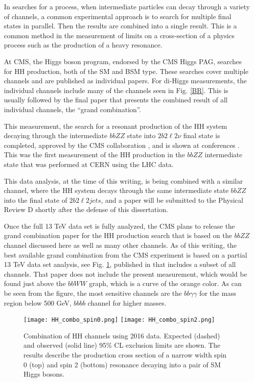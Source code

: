 \begin{small}
In searches for a process, when intermediate particles can decay through a variety of channels, a common experimental approach is to search for multiple final states in parallel. Then the results are combined into a single result. This is a common method in the measurement of limits on a cross-section of a physics process such as the production of a heavy resonance.

At CMS, the Higgs boson program, endorsed by the CMS Higgs PAG, searches for HH production, both of the SM and BSM type. These searches cover multiple channels and are published as individual papers. For di-Higgs measurements, the individual channels include many of the channels seen in Fig. \ref{BR}. This is usually followed by the final paper that presents the combined result of all individual channels, the ``grand combination''.

This measurement, the search for a resonant production of the HH system decaying through the intermediate $bbZZ$ state into $2 b 2 \ell 2 \nu$ final state is completed, approved by the CMS collaboration \cite{CMS-PAS-HIG-17-032}, and is shown at conferences \cite{HiggsCouplings2018}. This was the first measurement of the HH production in the $bbZZ$ intermediate state that was performed at CERN using the LHC data. 

This data analysis, at the time of this writing, is being combined with a similar channel, where the HH system decays through the same intermediate state $bbZZ$ into the final state of $2 b 2 \ell 2 jets$, and a paper will be submitted to the Physical Review D shortly after the defense of this dissertation.

Once the full 13 TeV data set is fully analyzed, the CMS plans to release the grand combination paper for the HH production search that is based on the $bbZZ$ channel discussed here as well as many other channels. As of this writing, the best available grand combination from the CMS experiment is based on a partial 13 TeV data set analysis, see Fig. \ref{HH_combo}, published in \cite{HH_combo} that includes a subset of all channels. That paper does not include the present measurement, which would be found just above the $bbWW$ graph, which is a curve of the orange color. As can be seen from the figure, the most sensitive channels are the $bb\gamma\gamma$ for the mass region below 500 GeV, $bbbb$ channel for higher masses.

\begin{figure}[H]%
  \begin{center}
    \texttt{[image: HH\_combo\_spin0.png]}
    \texttt{[image: HH\_combo\_spin2.png]}
    \caption{ Combination of HH channels using 2016 data. Expected (dashed) and observed (solid line) 95\% CL exclusion limits are shown. The results describe the production cross section of a narrow width spin 0 (top) and spin 2 (bottom) resonance decaying into a pair of SM Higgs bosons.  }
    \label{HH_combo}
  \end{center}
\end{figure}


\end{small}
